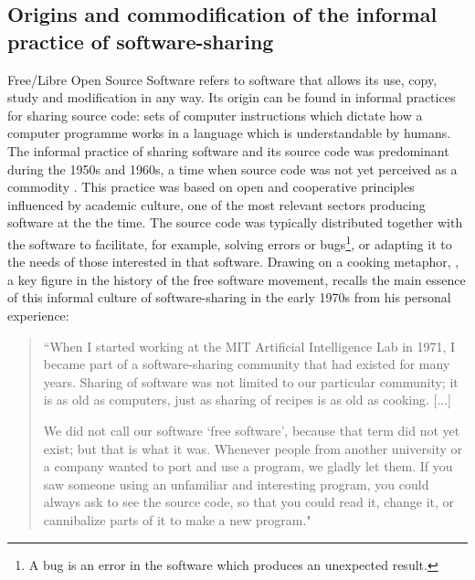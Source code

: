 \subsection{Origins and commodification of the informal practice of software-sharing}
\label{subsec:origins-floss}

Free\slash Libre Open Source Software refers to software that allows its use, copy, study and modification in any way. Its origin can be found in informal practices for sharing source code: sets of computer instructions which dictate how a computer programme works in a language which is understandable by humans. The informal practice of sharing software and its source code was predominant during the 1950s and 1960s, a time when source code was not yet perceived as a commodity \parencite{deibel2013open, deibel2014open}. This practice was based on open and cooperative principles influenced by academic culture, one of the most relevant sectors producing software at the the time. The source code was typically distributed together with the software to facilitate, for example, solving errors or bugs\footnote{A bug is an error in the software which produces an unexpected result.}, or adapting it to the needs of those interested in that software. Drawing on a cooking metaphor, \textcite[17]{stallman2002free}, a key figure in the history of the free software movement, recalls the main essence of this informal culture of software-sharing in the early 1970s from his personal experience:

\begin{quotation}
``When I started working at the MIT Artificial Intelligence Lab in 1971, I became
part of a software-sharing community that had existed for many years. Sharing of
software was not limited to our particular community; it is as old as computers, just
as sharing of recipes is as old as cooking. [...]

We did not call our software `free software', because that term did not yet exist;
but that is what it was. Whenever people from another university or a company
wanted to port and use a program, we gladly let them. If you saw someone using
an unfamiliar and interesting program, you could always ask to see the source code,
so that you could read it, change it, or cannibalize parts of it to make a new program."
\end{quotation}

